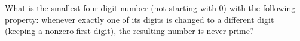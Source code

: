 What is the smallest four-digit number (not starting with $0$) with the following property: whenever exactly one of its digits is changed to a different digit (keeping a nonzero first digit), the resulting number is never prime?
